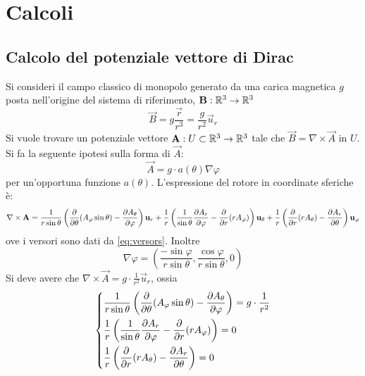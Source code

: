 \section{Calcoli}
\subsection{Calcolo del potenziale vettore di Dirac}
\label{sec:dirac_potential}
Si consideri il campo classico di monopolo generato da una carica magnetica $g$ posta
nell'origine del sistema di riferimento, $\vec B : \R ^3 \to \R ^3$
    $$ \vec B = g\frac{\vec r}{r^3} = \frac{g}{r^2} \vec u _r $$
Si vuole trovare un potenziale vettore $\vec A : U \subset \R ^3 \to \R ^3$ tale che
$ \vec B = \nabla \times \vec A $ in $U$. Si fa la seguente ipotesi sulla forma di $\vec A$:
   $$ \vec A = g \cdot a(\theta) \nabla \varphi $$
per un'opportuna funzione $a(\theta)$.
L'espressione del rotore in coordinate sferiche è:
$$
    \nabla \times \vec A =
         \frac{1}{r\sin\theta} \left(
              \frac{\partial}{\partial\theta}(A_\varphi\sin\theta) -
              \frac{\partial A_\theta}{\partial\varphi}
              \right) \vec u _r \\
         + \frac{1}{r} \left(
              \frac{1}{\sin\theta}\frac{\partial A_r}{\partial\varphi} -
              \frac{\partial}{\partial r}(r A_\varphi)
              \right)\vec u _\theta \\
         + \frac{1}{r} \left(
              \frac{\partial}{\partial r}(r A_\theta) - \frac{\partial A_r}{\partial\theta}
              \right)\vec u _\varphi
$$
ove i versori sono dati da \ref{eq:versors}. Inoltre
$$
   \nabla \varphi = \left( \frac{-\sin\varphi}{r\sin\theta},\frac{\cos\varphi}{r\sin\theta},0 \right)
$$
Si deve avere che $ \nabla \times \vec A = g \cdot \frac{1}{r^2} \vec u _r$,
ossia
\begin{equation*}
   \begin{dcases}
       \frac{1}{r\sin\theta} \left(
            \frac{\partial}{\partial\theta}(A_\varphi\sin\theta) -
            \frac{\partial A_\theta}{\partial\varphi}
            \right) = g \cdot \frac{1}{r^2} \\
       \frac{1}{r} \left(
            \frac{1}{\sin\theta}\frac{\partial A_r}{\partial\varphi} -
            \frac{\partial}{\partial r}(r A_\varphi)
            \right) = 0 \\
       \frac{1}{r} \left(
            \frac{\partial}{\partial r}(r A_\theta) - \frac{\partial A_r}{\partial\theta}
            \right) = 0
   \end{dcases}
\end{equation*}
